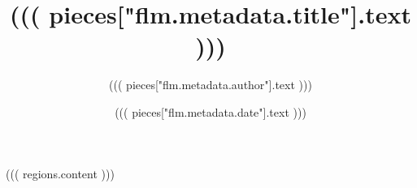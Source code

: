 \documentclass[twocolumn]{article}
\begin{document}
\title{((( pieces["flm.metadata.title"].text )))}
\author{((( pieces["flm.metadata.author"].text )))}
\date{((( pieces["flm.metadata.date"].text )))}
\maketitle
((( regions.content )))
\end{document}
